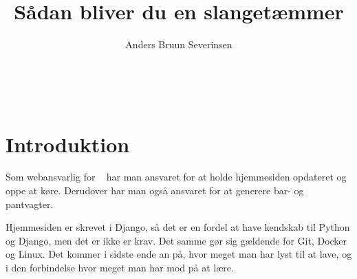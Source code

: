 

\title{Sådan bliver du en slangetæmmer}
\date{}
\author{Anders Bruun Severinsen}



\maketitle

\tableofcontents \

\section{Introduktion}

Som webansvarlig for \fredagscafeen~ har man ansvaret for at holde hjemmesiden opdateret og oppe at køre.
Derudover har man også ansvaret for at generere bar- og pantvagter.

Hjemmesiden er skrevet i Django, så det er en fordel at have kendskab til Python og Django, men det er
ikke er krav. Det samme gør sig gældende for Git, Docker og Linux. Det kommer i sidste ende an på, hvor
meget man har lyst til at lave, og i den forbindelse hvor meget man har mod på at lære.











